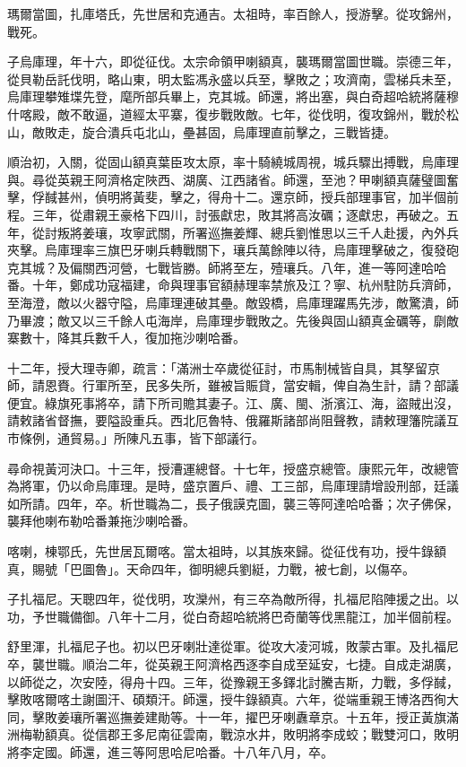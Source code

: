 \begin{pinyinscope}
瑪爾當圖，扎庫塔氏，先世居和克通吉。太祖時，率百餘人，授游擊。從攻錦州，戰死。

子烏庫理，年十六，即從征伐。太宗命領甲喇額真，襲瑪爾當圖世職。崇德三年，從貝勒岳託伐明，略山東，明太監馮永盛以兵至，擊敗之；攻濟南，雲梯兵未至，烏庫理攀雉堞先登，麾所部兵畢上，克其城。師還，將出塞，與白奇超哈統將薩穆什喀殿，敵不敢逼，道經太平寨，復步戰敗敵。七年，從伐明，復攻錦州，戰於松山，敵敗走，旋合潰兵屯北山，壘甚固，烏庫理直前擊之，三戰皆捷。

順治初，入關，從固山額真葉臣攻太原，率十騎繞城周視，城兵驟出搏戰，烏庫理與。尋從英親王阿濟格定陜西、湖廣、江西諸省。師還，至池？甲喇額真薩璧圖奮擊，俘馘甚州，偵明將黃斐，擊之，得舟十二。還京師，授兵部理事官，加半個前程。三年，從肅親王豪格下四川，討張獻忠，敗其將高汝礪；逐獻忠，再破之。五年，從討叛將姜瓖，攻寧武關，所署巡撫姜輝、總兵劉惟思以三千人赴援，內外兵夾擊。烏庫理率三旗巴牙喇兵轉戰關下，瓖兵萬餘陣以待，烏庫理擊破之，復發砲克其城？及偏關西河營，七戰皆勝。師將至左，殪瓖兵。八年，進一等阿達哈哈番。十年，鄭成功寇福建，命與理事官額赫理率禁旅及江？寧、杭州駐防兵濟師，至海澄，敵以火器守隘，烏庫理連破其壘。敵毀橋，烏庫理躍馬先涉，敵驚潰，師乃畢渡；敵又以三千餘人屯海岸，烏庫理步戰敗之。先後與固山額真金礪等，劘敵寨數十，降其兵數千人，復加拖沙喇哈番。

十二年，授大理寺卿，疏言：「滿洲士卒歲從征討，市馬制械皆自具，其孥留京師，請恩賚。行軍所至，民多失所，雖被旨賑貸，當安輯，俾自為生計，請？部議便宜。綠旗死事將卒，請下所司贍其妻子。江、廣、閩、浙濱江、海，盜賊出沒，請敕諸省督撫，要隘設重兵。西北厄魯特、俄羅斯諸部尚阻聲教，請敕理籓院議互市條例，通貿易。」所陳凡五事，皆下部議行。

尋命視黃河決口。十三年，授漕運總督。十七年，授盛京總管。康熙元年，改總管為將軍，仍以命烏庫理。是時，盛京置戶、禮、工三部，烏庫理請增設刑部，廷議如所請。四年，卒。析世職為二，長子俄謨克圖，襲三等阿達哈哈番；次子佛保，襲拜他喇布勒哈番兼拖沙喇哈番。

喀喇，棟鄂氏，先世居瓦爾喀。當太祖時，以其族來歸。從征伐有功，授牛錄額真，賜號「巴圖魯」。天命四年，御明總兵劉綎，力戰，被七創，以傷卒。

子扎福尼。天聰四年，從伐明，攻灤州，有三卒為敵所得，扎福尼陷陣援之出。以功，予世職備御。八年十二月，從白奇超哈統將巴奇蘭等伐黑龍江，加半個前程。

舒里渾，扎福尼子也。初以巴牙喇壯達從軍。從攻大凌河城，敗蒙古軍。及扎福尼卒，襲世職。順治二年，從英親王阿濟格西逐李自成至延安，七捷。自成走湖廣，以師從之，次安陸，得舟十四。三年，從豫親王多鐸北討騰吉斯，力戰，多俘馘，擊敗喀爾喀土謝圖汗、碩類汗。師還，授牛錄額真。六年，從端重親王博洛西徇大同，擊敗姜瓖所署巡撫姜建勛等。十一年，擢巴牙喇纛章京。十五年，授正黃旗滿洲梅勒額真。從信郡王多尼南征雲南，戰涼水井，敗明將李成蛟；戰雙河口，敗明將李定國。師還，進三等阿思哈尼哈番。十八年八月，卒。


\end{pinyinscope}
